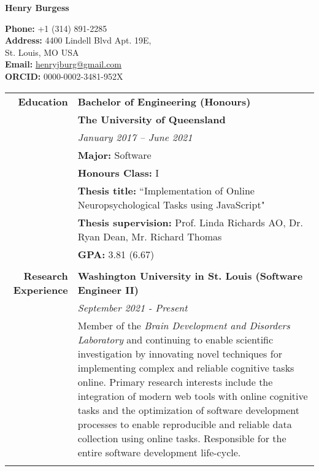 \documentclass{article}
\begin{document}
	\begin{minipage}{2.5in}
		\huge\textbf{Henry Burgess} 
	\end{minipage}
	\hfill
	\begin{minipage}{3in}
		\textbf{Phone:}  +1 (314) 891-2285 \\
		\hfill \textbf{Address:} 4400 Lindell Blvd Apt. 19E, \\
		St. Louis, MO USA \\
		\textbf{Email:} \href{mailto:henryjburg@gmail.com}{henryjburg@gmail.com} \\
		\textbf{ORCID:} 0000-0002-3481-952X
	\end{minipage}
	\begin{longtable}{r | p{13cm}} 	
		\large\textbf{Education} 		  	& \large\textbf{Bachelor of Engineering (Honours)} \\
											& \textbf{The University of Queensland} \\
											& \textit{January 2017 – June 2021} \\
											& \textbf{Major:} Software \\
											& \textbf{Honours Class:} I \\
											& \textbf{Thesis title:} ``Implementation of Online Neuropsychological Tasks using JavaScript" \\
											& \textbf{Thesis supervision:} Prof. Linda Richards AO, Dr. Ryan Dean, Mr. Richard Thomas \\
											& \textbf{GPA:} 3.81 (6.67) \\
											& \\

		\large\textbf{Research Experience}  & \large\textbf{Washington University in St. Louis (Software Engineer II)} \\
											& \textit{September 2021 - Present} \\
											& Member of the \textit{Brain Development and Disorders Laboratory} and continuing to enable scientific investigation by innovating novel techniques for implementing complex and reliable cognitive tasks online. Primary research interests include the integration of modern web tools with online cognitive tasks and the optimization of software development processes to enable reproducible and reliable data collection using online tasks. Responsible for the entire software development life-cycle. \\ 
											& \\


\end{longtable}
\end{document}
